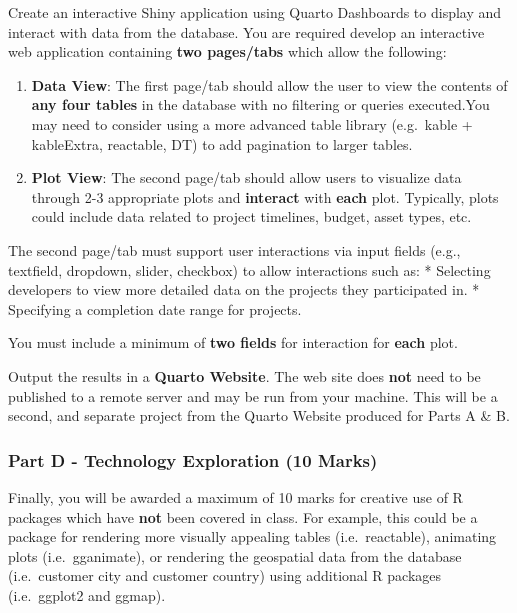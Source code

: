 \documentclass[
  letterpaper,
  DIV=11,
  numbers=noendperiod]{scrartcl}
\providecommand{\tightlist}{%
  \setlength{\itemsep}{0pt}\setlength{\parskip}{0pt}}\usepackage{longtable,booktabs,array}
\begin{document}
Create an interactive Shiny application using Quarto Dashboards to
display and interact with data from the database. You are required
develop an interactive web application containing \textbf{two
pages/tabs} which allow the following:

\begin{enumerate}
\def\labelenumi{\arabic{enumi}.}
\tightlist
\item
  \textbf{Data View}: The first page/tab should allow the user to view
  the contents of \textbf{any four tables} in the database with no
  filtering or queries executed.You may need to consider using a more
  advanced table library (e.g.~kable + kableExtra, reactable, DT) to add
  pagination to larger tables.
\item
  \textbf{Plot View}: The second page/tab should allow users to
  visualize data through 2-3 appropriate plots and \textbf{interact}
  with \textbf{each} plot. Typically, plots could include data related
  to project timelines, budget, asset types, etc.
\end{enumerate}

The second page/tab must support user interactions via input fields
(e.g., textfield, dropdown, slider, checkbox) to allow interactions such
as: * Selecting developers to view more detailed data on the projects
they participated in. * Specifying a completion date range for projects.

You must include a minimum of \textbf{two fields} for interaction for
\textbf{each} plot.

Output the results in a \textbf{Quarto Website}. The web site does
\textbf{not} need to be published to a remote server and may be run from
your machine. This will be a second, and separate project from the
Quarto Website produced for Parts A \& B.

\subsubsection{Part D - Technology Exploration (10
Marks)}\label{part-d---technology-exploration-10-marks}

Finally, you will be awarded a maximum of 10 marks for creative use of R
packages which have \textbf{not} been covered in class. For example,
this could be a package for rendering more visually appealing tables
(i.e.~reactable), animating plots (i.e.~gganimate), or rendering the
geospatial data from the database (i.e.~customer city and customer
country) using additional R packages (i.e.~ggplot2 and ggmap).
\end{document}
